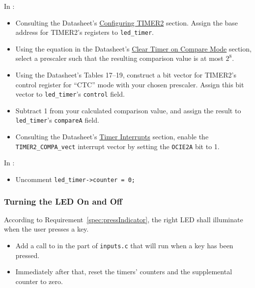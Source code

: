 In :
\begin{itemize}
    \item Consulting the Datasheet's \href{https://cow-pi.readthedocs.io/en/latest/microcontroller.html#configuring-timer2}{Configuring TIMER2} section.
        Assign the base address for TIMER2's registers to \lstinline{led_timer}.
    \item Using the equation in the Datasheet's \href{https://cow-pi.readthedocs.io/en/latest/microcontroller.html#clear-timer-on-compare-mode}{Clear Timer on Compare Mode} section,
        select a prescaler such that the resulting comparison value is at most $2^8$.
    \item Using the Datasheet's Tables 17--19, construct a bit vector for TIMER2's control register for ``CTC'' mode with your chosen prescaler.
        Assign this bit vector to \lstinline{led_timer}'s \lstinline{control} field.
    \item Subtract 1 from your calculated comparison value, and assign the result to \lstinline{led_timer}'s \lstinline{compareA} field.
    \item Consulting the Datasheet's \href{https://cow-pi.readthedocs.io/en/latest/microcontroller.html#timer-interrupts}{Timer Interrupts} section, enable the \lstinline{TIMER2_COMPA_vect} interrupt vector by setting the \lstinline{OCIE2A} bit to 1.
\end{itemize}

In :

\begin{itemize}
    \item Uncomment \lstinline{led_timer->counter = 0;}
\end{itemize}

\subsubsection{Turning the LED On and Off}

According to Requirement~\ref{spec:pressIndicator}, the right LED shall illuminate when the user presses a key.
\begin{itemize}
    \item Add a call to  in the part of \lstinline{inputs.c} that will run when a key has been pressed.
    \item Immediately after that, reset the timers' counters and the supplemental counter to zero.
\end{itemize}

